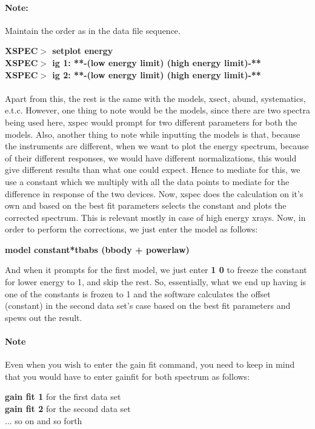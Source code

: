 \documentclass[a4paper,twoside]{report}
\numberwithin{equation}{section}
\begin{document}
\paragraph{Note:} Maintain the order as in the data file sequence.
\begin{center}
\textbf{XSPEC$>$ setplot energy} \\
\textbf{XSPEC$>$ ig 1: **-(low energy limit) (high energy limit)-**} \\
\textbf{XSPEC$>$ ig 2: **-(low energy limit) (high energy limit)-**}
\end{center}
\paragraph{}
Apart from this, the rest is the same with the models, xsect, abund, systematics, e.t.c. However, one thing to note would be the models, since there are two spectra being used here, xspec would prompt for two different parameters for both the models. Also, another thing to note while inputting the models is that, because the instruments are different, when we want to plot the energy spectrum, because of their different responses, we would have different normalizations, this would give different results than what one could expect. Hence to mediate for this, we use a constant which we multiply with all the data points to mediate for the difference in response of the two devices. Now, xspec does the calculation on it's own and based on the best fit parameters selects the constant and plots the corrected spectrum. This is relevant mostly in case of high energy xrays. Now, in order to perform the corrections, we just enter the model as follows:
\begin{center}
\textbf{model constant*tbabs (bbody + powerlaw)}
\end{center}
And when it prompts for the first model, we just enter \textbf{1 0} to freeze the constant for lower energy to 1, and skip the rest. So, essentially, what we end up having is one of the constants is frozen to 1 and the software calculates the offset (constant) in the second data set's case based on the best fit parameters and spews out the result. 
\paragraph{Note}
Even when you wish to enter the gain fit command, you need to keep in mind that you would have to enter gainfit for both spectrum as follows:
\begin{center}
\textbf{gain fit 1} for the first data set \\
\textbf{gain fit 2} for the second data set \\ 
... so on and so forth
\end{center}
\end{document}
